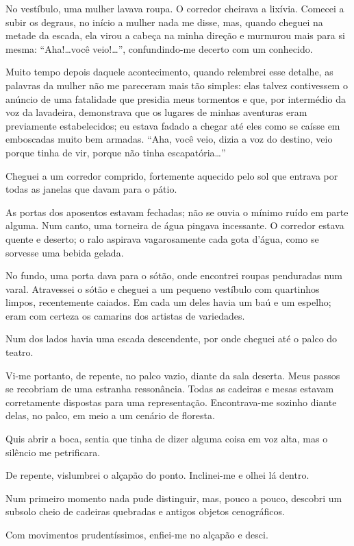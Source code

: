 No vestíbulo, uma mulher lavava roupa. O corredor cheirava a lixívia. Comecei a subir os degraus, no início a mulher nada me disse, mas, quando cheguei na metade da escada, ela virou a cabeça na minha direção e murmurou mais para si mesma: ``Aha!\dots você veio!\dots'', confundindo-me decerto com um conhecido.

Muito tempo depois daquele acontecimento, quando relembrei esse detalhe, as palavras da mulher não me pareceram mais tão simples: elas talvez contivessem o anúncio de uma fatalidade que presidia meus tormentos e que, por intermédio da voz da lavadeira, demonstrava que os lugares de minhas aventuras eram previamente estabelecidos; eu estava fadado a chegar até eles como se caísse em emboscadas muito bem armadas. ``Aha, você veio, dizia a voz do destino, veio porque tinha de vir, porque não tinha escapatória\ldots''

Cheguei a um corredor comprido, fortemente aquecido pelo sol que entrava por todas as janelas que davam para o pátio.

As portas dos aposentos estavam fechadas; não se ouvia o mínimo ruído em parte alguma. Num canto, uma torneira de água pingava incessante. O corredor estava quente e deserto; o ralo aspirava vagarosamente cada gota d’água, como se sorvesse uma bebida gelada. 

No fundo, uma porta dava para o sótão, onde encontrei roupas penduradas num varal. Atravessei o sótão e cheguei a um pequeno vestíbulo com quartinhos limpos, recentemente caiados. Em cada um deles havia um baú e um espelho; eram com certeza os camarins dos artistas de variedades.

Num dos lados havia uma escada descendente, por onde cheguei até o palco do teatro.

Vi-me portanto, de repente, no palco vazio, diante da sala deserta. Meus passos se recobriam de uma estranha ressonância. Todas as cadeiras e mesas estavam corretamente dispostas para uma representação. Encontrava-me sozinho diante delas, no palco, em meio a um cenário de floresta.

Quis abrir a boca, sentia que tinha de dizer alguma coisa em voz alta, mas o silêncio me petrificara.

De repente, vislumbrei o alçapão do ponto. Inclinei-me e olhei lá dentro.

Num primeiro momento nada pude distinguir, mas, pouco a pouco, descobri um subsolo cheio de cadeiras quebradas e antigos objetos cenográficos.

Com movimentos prudentíssimos, enfiei-me no alçapão e desci.


